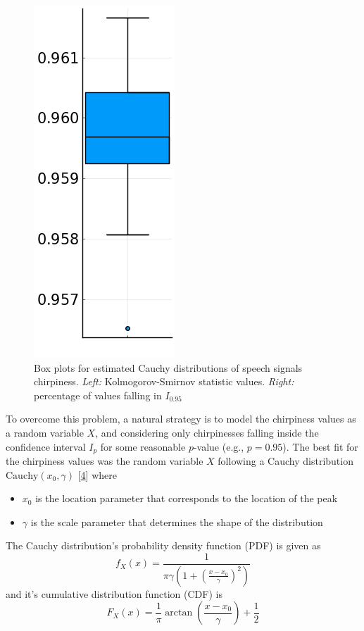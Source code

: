 \documentclass[
  american,
]{article}
\providecommand{\tightlist}{%
  \setlength{\itemsep}{0pt}\setlength{\parskip}{0pt}}
\begin{document}
\begin{figure}[H]
\begin{minipage}{.47\linewidth}
        \includegraphics[width=.27\textwidth]{img/cauchy_values_percentage_iqr_2.png}
    \caption{Box plots for estimated Cauchy distributions of speech signals chirpiness.
    \emph{Left:} Kolmogorov-Smirnov statistic values.
    \emph{Right:} percentage of values falling in $I_{0.95}$}
    \end{minipage}
\end{figure}

To overcome this problem, a natural strategy is to model the chirpiness values as
a random variable \(X\), and considering only chirpinesses falling inside the confidence
interval \(I_p\) for some reasonable \(p\)-value (e.g., \(p=0.95\)).
The best fit for the chirpiness values was the random variable \(X\)
following a Cauchy distribution \(\mathrm{Cauchy}(x_0,\gamma)\) {[}\protect\hyperlink{ref-asswad2021}{4}{]} where

\begin{itemize}
\tightlist
\item
  \(x_0\) is the location parameter that corresponds to the location of the peak
\item
  \(\gamma\) is the scale parameter that determines the shape of the distribution
\end{itemize}

The Cauchy distribution's probability density function (PDF) is given as
\begin{equation}
f_X(x)=\frac{1}{\pi\gamma\left(1+\left(\frac{x-x_0}{\gamma}\right)^2\right)}
\end{equation}
and it's cumulative distribution function (CDF) is
\begin{equation}
F_X(x)=\frac{1}{\pi} \arctan\left(\frac{x-x_0}{\gamma}\right) + \frac{1}{2}
\end{equation}
\end{document}
